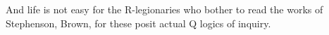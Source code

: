 And life is not easy for the ‪‎R‬-legionaries who bother to read the works of ‪Stephenson‬, ‪‎Brown‬, for these posit actual ‪Q‬ logics of inquiry.